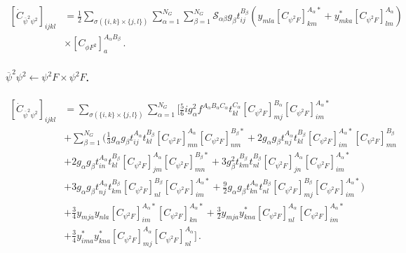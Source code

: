 \begin{align}
    \left[\dot C_{\overline \psi^2 \psi^2}\right]_{ijkl} &= \frac{1}{2} \sum_{\sigma(\{i,k\} \times \{j,l\})} \sum_{\alpha = 1}^{N_G} \sum_{\beta = 1}^{N_G} \mathcal{S}_{\alpha\beta} g_\beta t_{ij}^{B_\beta} \left(y_{mla} \left[C_{\psi^2 F}\right]^{A_\alpha *}_{km} + y^*_{mka} \left[C_{\psi^2 F}\right]^{A_\alpha }_{lm} \right)
    \nonumber \\
    &\times\left[C_{\phi F^2}\right]_{a}^{A_\alpha B_\beta}\,.
\end{align}

\paragraph{$\overline \psi^2 \psi^2 \leftarrow \psi^2 F\times \psi^2 F$.}

\begin{align}
    \left[\dot C_{\overline \psi^2 \psi^2}\right]_{ijkl} &=
    \sum_{\sigma(\{i,k\} \times \{j,l\})}\sum_{\alpha=1}^{N_G}
    \Bigg[
 \frac{5}{6}i g_\alpha^2 f^{A_\alpha B_\alpha C_\alpha} t^{C_\alpha}_{kl} \left[C_{\psi^2 F}\right]_{mj}^{B_\alpha}\left[C_{\psi^2 F}\right]_{im}^{A_\alpha *}
 \nonumber \\&
 +\sum_{\beta=1}^{N_G}\Bigg( \frac{1}{3} g_\alpha g_\beta t^{A_\alpha}_{ij} t^{B_\beta}_{kl}\left[C_{\psi^2 F}\right]_{mn}^{A_\alpha}\left[C_{\psi^2 F}\right]_{nm}^{B_\beta *} 
+ 2  g_\alpha g_\beta t^{A_\alpha}_{nj} t^{B_\beta}_{kl} \left[C_{\psi^2 F}\right]_{im}^{A_\alpha *}\left[C_{\psi^2 F}\right]_{mn}^{B_\beta} 
\nonumber \\&
+ 2  g_\alpha g_\beta t^{A_\alpha}_{in} t^{B_\beta }_{kl} \left[C_{\psi^2 F}\right]_{jm}^{A_\alpha}\left[C_{\psi^2 F}\right]_{mn}^{B_\beta *} 
+ 3  g_\beta^2 t^{B_\beta}_{km} t^{B_\beta}_{nl} \left[C_{\psi^2 F}\right]_{jn}^{A_\alpha}\left[C_{\psi^2 F}\right]_{im}^{A_\alpha *} 
\nonumber \\&
+3  g_\alpha g_\beta t^{A_\alpha}_{nj} t^{B_\beta}_{km} \left[C_{\psi^2 F}\right]_{nl}^{B_\beta}\left[C_{\psi^2 F}\right]_{im}^{A_\alpha *} 
+ \frac{9}{2}  g_\alpha g_\beta t^{A_\alpha}_{kn} t^{B_\beta}_{nl} \left[C_{\psi^2 F}\right]_{mj}^{B_\beta}\left[C_{\psi^2 F}\right]_{im}^{A_\alpha *} \Bigg)
\nonumber \\&
+ \frac{3}{4}y_{mja}y_{nla}\left[C_{\psi^2 F}\right]^{A_\alpha *}_{im}\left[C_{\psi^2 F}\right]^{A_\alpha *}_{kn}
+ \frac{3}{2}y_{mja}y_{kna}^*\left[C_{\psi^2 F}\right]^{A_\alpha}_{nl}\left[C_{\psi^2 F}\right]^{A_\alpha *}_{im}
\nonumber \\&
+ \frac{3}{4}y_{ima}^*y_{kna}^*\left[C_{\psi^2 F}\right]^{A_\alpha}_{mj}\left[C_{\psi^2 F}\right]^{A_\alpha}_{nl}
    \Bigg]\,.
\end{align}

